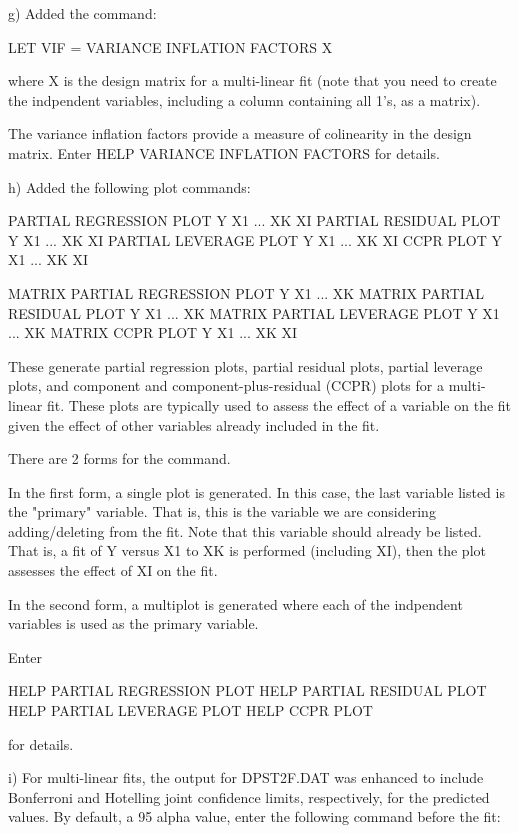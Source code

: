 {    g) Added the command:

          LET VIF = VARIANCE INFLATION FACTORS X

       where X is the design matrix for a multi-linear fit
       (note that you need to create the indpendent variables,
       including a column containing all 1's, as a matrix).

       The variance inflation factors provide a measure of
       colinearity in the design matrix.  Enter
       HELP VARIANCE INFLATION FACTORS for details.

    h) Added the following plot commands:

         PARTIAL REGRESSION PLOT Y X1 ... XK  XI
         PARTIAL RESIDUAL PLOT Y X1 ... XK  XI
         PARTIAL LEVERAGE PLOT Y X1 ... XK  XI
         CCPR PLOT Y X1 ... XK  XI

         MATRIX PARTIAL REGRESSION PLOT Y X1 ... XK
         MATRIX PARTIAL RESIDUAL PLOT Y X1 ... XK
         MATRIX PARTIAL LEVERAGE PLOT Y X1 ... XK
         MATRIX CCPR PLOT Y X1 ... XK  XI

       These generate partial regression plots, partial residual
       plots, partial leverage plots, and component and
       component-plus-residual (CCPR) plots for a multi-linear fit.
       These plots are typically used to assess the effect of
       a variable on the fit given the effect of other variables
       already included in the fit.

       There are 2 forms for the command.

       In the first form, a single plot is generated.  In this case,
       the last variable listed is the "primary" variable.  That is,
       this is the variable we are considering adding/deleting from
       the fit.  Note that this variable should already be listed.
       That is, a fit of Y versus X1 to XK is performed (including XI),
       then the plot assesses the effect of XI on the fit.

       In the second form, a multiplot is generated where each
       of the indpendent variables is used as the primary variable.

       Enter

          HELP PARTIAL REGRESSION PLOT
          HELP PARTIAL RESIDUAL PLOT
          HELP PARTIAL LEVERAGE PLOT
          HELP CCPR PLOT

       for details.

    i) For multi-linear fits, the output for DPST2F.DAT was
       enhanced to include Bonferroni and Hotelling joint
       confidence limits, respectively, for the predicted values.  
       By default, a 95%
       alpha value, enter the following command before the fit:

}
